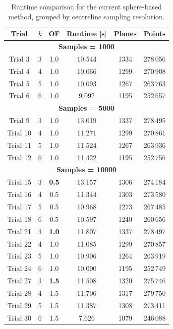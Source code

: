 \begin{table}[htbp]
    \centering
    \caption{Runtime comparison for the current sphere-based method, grouped by centreline sampling resolution.}
    \label{tab:ec1_grouped_new_algorithm}
    \scriptsize
    \begin{tabular}{cccccc}
        \toprule
        Trial & $k$ & OF & Runtime [s] & Planes & Points \\
        \midrule

        \multicolumn{6}{c}{\textbf{Samples = 1000}} \\
        \midrule
        Trial 3 & 3 & 1.0 & 10.544 & 1334 & 278\,056 \\
        Trial 4 & 4 & 1.0 & 10.066 & 1299 & 270\,908 \\
        Trial 5 & 5 & 1.0 & 10.093 & 1267 & 263\,763 \\
        Trial 6 & 6 & 1.0 & 9.092 & 1195 & 252\,657 \\

        \midrule
        \multicolumn{6}{c}{\textbf{Samples = 5000}} \\
        \midrule
        Trial 9  & 3 & 1.0 & 13.019 & 1337 & 278\,495 \\
        Trial 10 & 4 & 1.0 & 11.271 & 1299 & 270\,861 \\
        Trial 11 & 5 & 1.0 & 11.524 & 1267 & 263\,936 \\
        Trial 12 & 6 & 1.0 & 11.422 & 1195 & 252\,756 \\

        \midrule
        \multicolumn{6}{c}{\textbf{Samples = 10000}} \\
        \midrule
        Trial 15 & 3 & \textbf{0.5} & 13.157 & 1306 & 274\,184 \\
        Trial 16 & 4 & 0.5 & 11.344 & 1303 & 273\,580 \\
        Trial 17 & 5 & 0.5 & 10.968 & 1273 & 267\,485 \\
        Trial 18 & 6 & 0.5 & 10.597 & 1240 & 260\,656 \\

        \addlinespace

        Trial 21 & 3 & \textbf{1.0} & 11.807 & 1337 & 278\,497 \\
        Trial 22 & 4 & 1.0 & 11.085 & 1299 & 270\,857 \\
        Trial 23 & 5 & 1.0 & 10.906 & 1264 & 263\,919 \\
        Trial 24 & 6 & 1.0 & 10.000 & 1195 & 252\,749 \\

        \addlinespace

        Trial 27 & 3 & \textbf{1.5} & 11.508 & 1320 & 275\,746 \\
        Trial 28 & 4 & 1.5 & 11.706 & 1317 & 279\,750 \\
        Trial 29 & 5 & 1.5 & 11.387 & 1308 & 273\,411 \\
        Trial 30 & 6 & 1.5 & 7.626 & 1079 & 246\,088 \\
        \bottomrule
    \end{tabular}
\end{table}
